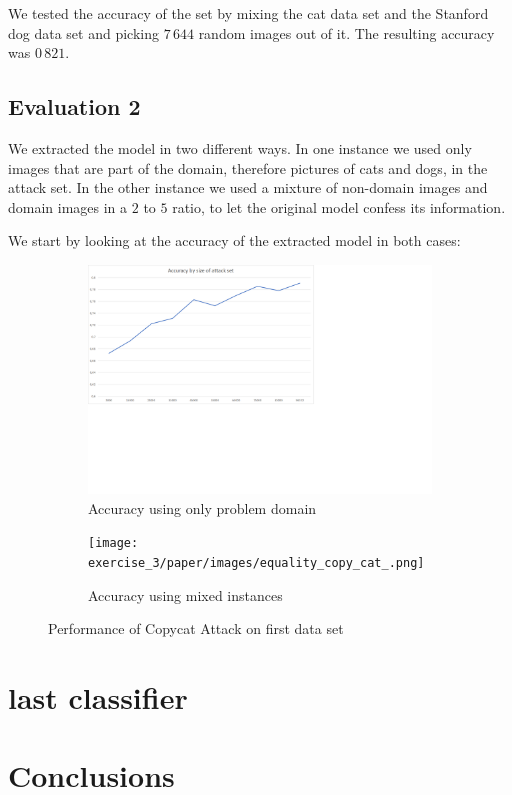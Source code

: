 \documentclass[a4paper,11pt]{article}
\begin{document}
            We tested the accuracy of the set by mixing the cat data set and the Stanford dog data set and picking $7\,644$ random images out of it. The resulting accuracy was $0\,821$.
    \subsection{Evaluation 2}
    We extracted the model in two different ways. In one instance we used only images that are part of the domain, therefore pictures of cats and dogs, in the attack set. In the other instance we used a mixture of non-domain images and domain images in a $2$ to $5$ ratio, to let the original model confess its information. 
    
    We start by looking at the accuracy of the extracted model in both cases:
            \begin{figure}[h!]
            \centering
            \begin{subfigure}[c]{0.49\textwidth}
                \centering
                \includegraphics[width=1\textwidth]{exercise_3/paper/images/accuracy_copy_cat.png}
                \caption{Accuracy using only problem domain}
                \label{fig:Accuracy_Azure}
            \end{subfigure}
            \begin{subfigure}[c]{0.49\textwidth}
                \centering
                \texttt{[image: exercise\_3/paper/images/equality\_copy\_cat\_.png]}
                \caption{Accuracy using mixed instances }
                \label{fig:Equality_Azure}
            \end{subfigure}
            \caption{Performance of Copycat Attack on first data set}
            \label{fig:performance-azure}
        \end{figure}

\section{last classifier}
\section{Conclusions}



\end{document}
